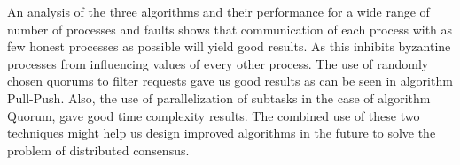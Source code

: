 An analysis of the three algorithms and their performance for a wide range of number of processes and faults shows that communication of each process with as few honest processes as possible will yield good results. As this inhibits byzantine processes from influencing values of every other process. The use of randomly chosen quorums to filter requests gave us good results as can be seen in algorithm Pull-Push. Also, the use of parallelization of subtasks in the case of algorithm Quorum, gave good time complexity results. The combined use of these two techniques might help us design improved algorithms in the future to solve the problem of distributed consensus. 




